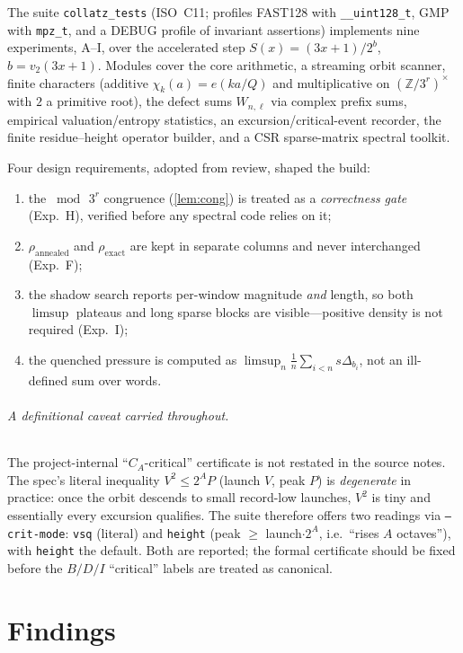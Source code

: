 \documentclass[11pt]{article}
\newcommand{\Z}{\mathbb{Z}}
\theoremstyle{plain}
\theoremstyle{remark}
\begin{document}
The suite \texttt{collatz\_tests} (ISO~C11; profiles \textsf{FAST128} with
\texttt{\_\_uint128\_t}, \textsf{GMP} with \texttt{mpz\_t}, and a \textsf{DEBUG}
profile of invariant assertions) implements nine experiments, A--I, over the
accelerated step $S(x)=(3x+1)/2^{b}$, $b=v_2(3x+1)$. Modules cover the core
arithmetic, a streaming orbit scanner, finite characters (additive
$\chi_k(a)=e(ka/Q)$ and multiplicative on $(\Z/3^r)^\times$ with $2$ a primitive
root), the defect sums $W_{n,\ell}$ via complex prefix sums, empirical
valuation/entropy statistics, an excursion/critical-event recorder, the finite
residue--height operator builder, and a CSR sparse-matrix spectral toolkit.

Four design requirements, adopted from review, shaped the build:
\begin{enumerate}[leftmargin=1.6em,itemsep=1pt]
\item the $\bmod\,3^r$ congruence (\cref{lem:cong}) is treated as a
\emph{correctness gate} (Exp.~H), verified before any spectral code relies on it;
\item $\rho_{\mathrm{annealed}}$ and $\rho_{\mathrm{exact}}$ are kept in separate
columns and never interchanged (Exp.~F);
\item the shadow search reports per-window magnitude \emph{and} length, so both
$\limsup$ plateaus and long sparse blocks are visible---positive density is not
required (Exp.~I);
\item the quenched pressure is computed as $\limsup_n\frac1n\sum_{i<n}s\Delta_{b_i}$,
not an ill-defined sum over words.
\end{enumerate}

\paragraph{A definitional caveat carried throughout.}
The project-internal ``$C_A$-critical'' certificate is not restated in the source
notes. The spec's literal inequality $V^2\le 2^A P$ (launch $V$, peak $P$) is
\emph{degenerate} in practice: once the orbit descends to small record-low
launches, $V^2$ is tiny and essentially every excursion qualifies. The suite
therefore offers two readings via \texttt{--crit-mode}: \texttt{vsq} (literal) and
\texttt{height} (peak $\ge$ launch$\cdot2^A$, i.e.\ ``rises $A$ octaves''), with
\texttt{height} the default. Both are reported; the formal certificate should be
fixed before the $B/D/I$ ``critical'' labels are treated as canonical.

\part{Findings}
\end{document}
